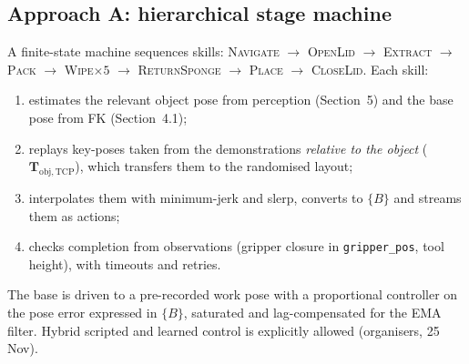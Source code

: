 \documentclass[10pt,a4paper]{article}
\begin{document}
\subsection{Approach A: hierarchical stage machine}
A finite-state machine sequences skills: \textsc{Navigate} $\rightarrow$ \textsc{OpenLid} $\rightarrow$ \textsc{Extract} $\rightarrow$ \textsc{Pack} $\rightarrow$ \textsc{Wipe}$\times5$ $\rightarrow$ \textsc{ReturnSponge} $\rightarrow$ \textsc{Place} $\rightarrow$ \textsc{CloseLid}. Each skill:
\begin{enumerate}
\item estimates the relevant object pose from perception (Section~5) and the base pose from FK (Section~4.1);
\item replays key-poses taken from the demonstrations \emph{relative to the object} ($\bm T_{\text{obj},\mathrm{TCP}}$), which transfers them to the randomised layout;
\item interpolates them with minimum-jerk and slerp, converts to $\{B\}$ and streams them as actions;
\item checks completion from observations (gripper closure in \texttt{gripper\_pos}, tool height), with timeouts and retries.
\end{enumerate}
The base is driven to a pre-recorded work pose with a proportional controller on the pose error expressed in $\{B\}$, saturated and lag-compensated for the EMA filter. Hybrid scripted and learned control is explicitly allowed (organisers, 25 Nov).
\end{document}
